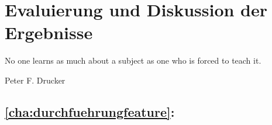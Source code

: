 \chapter{Evaluierung und Diskussion der Ergebnisse}
\label{cha:ergebnisse}

\epigraph{No one learns as much about a subject as one who is forced to teach it.}{Peter F. Drucker}

\section{\autoref{cha:durchfuehrungfeature}: }

\lipsum[3]

\newcommand{\specialcell}[2][c]{%
\begin{tabular}[#1]{@{}c@{}}#2\end{tabular}}

